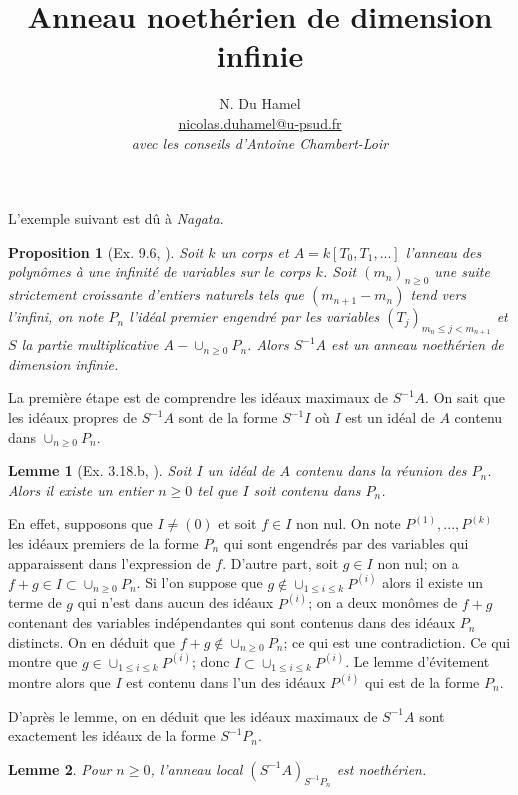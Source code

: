 \documentclass{article}
\newtheorem{proposition}{Proposition}
\newtheorem{lemme}{Lemme}
\begin{document}
\title{Anneau noethérien de dimension infinie}
\author{N. Du Hamel  \\ \href{mailto:nicolas.duhamel@u-psud.fr}{nicolas.duhamel@u-psud.fr} \\
\emph{avec les conseils d'Antoine Chambert-Loir}}
\maketitle

L'exemple suivant est dû à \emph{Nagata}.
\begin{proposition}[Ex. 9.6, \cite{eisenbud}]
Soit $k$ un corps et $A = k[T_0, T_1, ...]$ l'anneau des polynômes à une infinité de variables sur le corps $k$. Soit $(m_n)_{n \geq 0}$ une suite strictement croissante d'entiers naturels tels que $( m_{n+1} - m_n )$ tend vers l'infini, on note $P_n$ l'idéal premier engendré par les variables $(T_j)_{m_n \leq j < m_{n+1}}$ et $S$ la partie multiplicative $A-\cup_{n \geq 0}P_n$. Alors $S^{-1}A$ est un anneau noethérien de dimension infinie.
\end{proposition}

La première étape est de comprendre les idéaux maximaux de $S^{-1}A$.
On sait que les idéaux propres de $S^{-1}A$ sont de la forme $S^{-1}I$ où $I$ est un idéal de $A$ contenu dans $\cup_{n \geq 0}P_n$.

\begin{lemme}[Ex. 3.18.b, \cite{eisenbud}]
Soit $I$ un idéal de $A$ contenu dans la réunion des $P_n$. Alors il existe un entier $n \geq 0$ tel que $I$ soit contenu dans $P_n$.
\end{lemme}

En effet, supposons que $I \neq (0)$ et soit $f \in I$ non nul. On note $P^{(1)}, ..., P^{(k)}$ les idéaux premiers de la forme $P_n$ qui sont engendrés par des variables qui apparaissent dans l'expression de $f$. D'autre part, soit $g \in I$ non nul; on a $f+g \in I \subset \cup_{n \geq 0}P_n$. Si l'on suppose que $g \not\in \cup_{1 \leq i \leq k}P^{(i)}$ alors il existe un terme de $g$ qui n'est dans aucun des idéaux $P^{(i)}$; on a deux monômes de $f+g$ contenant des variables indépendantes qui sont contenus dans des idéaux $P_n$ distincts. On en déduit que $f+g \not\in \cup_{n \geq 0}P_n$; ce qui est une contradiction. Ce qui montre que $g \in \cup_{1 \leq i \leq k}P^{(i)}$; donc $I \subset \cup_{1 \leq i \leq k}P^{(i)}$. Le lemme d'évitement montre alors que $I$ est contenu dans l'un des idéaux $P^{(i)}$ qui est de la forme $P_n$.

D'après le lemme, on en déduit que les idéaux maximaux de $S^{-1}A$ sont exactement les idéaux de la forme $S^{-1}P_n$.
\begin{lemme}
Pour $n \geq 0$, l'anneau local $(S^{-1}A)_{S^{-1}P_n}$ est noethérien.
\end{lemme}
\end{document}
